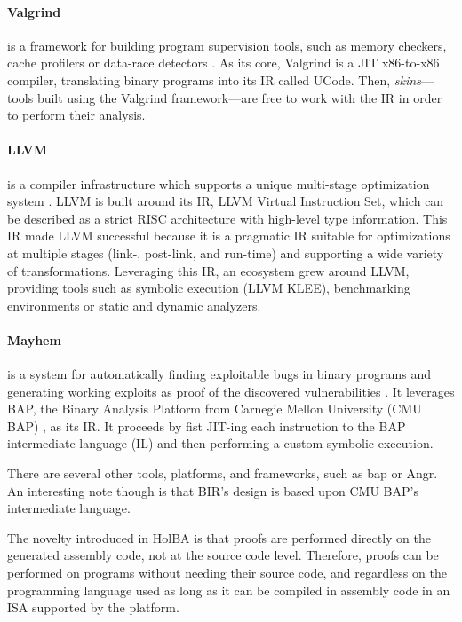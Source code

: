 \documentclass{kththesis}
\begin{document}
\paragraph{Valgrind} is a framework for building program supervision tools, such as memory checkers, cache profilers or data-race detectors \cite{nethercote_valgrind:_2003}. As its core, Valgrind is a JIT x86-to-x86 compiler, translating binary programs into its IR called UCode. Then, \textit{skins}---tools built using the Valgrind framework---are free to work with the IR in order to perform their analysis.

\paragraph{LLVM} is a compiler infrastructure which supports a unique multi-stage optimization system \cite{lattner_llvm:_2002}. LLVM is built around its \gls{IR}, LLVM Virtual Instruction Set, which can be described as a strict RISC architecture with high-level type information. This IR made LLVM successful because it is a pragmatic IR suitable for optimizations at multiple stages (link-, post-link, and run-time) and supporting a wide variety of transformations. Leveraging this IR, an ecosystem grew around LLVM, providing tools such as symbolic execution (LLVM KLEE), benchmarking environments or static and dynamic analyzers.

\paragraph{Mayhem} is a system for automatically finding exploitable bugs in binary programs and generating working exploits as proof of the discovered vulnerabilities \cite{cha_unleashing_2012}. It leverages BAP, the Binary Analysis Platform from Carnegie Mellon University (CMU BAP) \cite{brumley_bap:_2011}, as its IR. It proceeds by fist JIT-ing each instruction to the BAP intermediate language (IL) and then performing a custom symbolic execution.

There are several other tools, platforms, and frameworks, such as \gls{bap} \cite{noauthor_binary_2019} or Angr. An interesting note though is that BIR's design is based upon CMU BAP's intermediate language.

The novelty introduced in HolBA is that proofs are performed directly on the generated assembly code, not at the source code level. Therefore, proofs can be performed on programs without needing their source code, and regardless on the programming language used as long as it can be compiled in assembly code in an \gls{ISA} supported by the platform.
\end{document}
